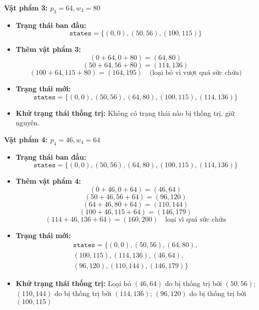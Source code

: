 \begin{example}
\textbf{Vật phẩm 3: \( p_3 = 64, w_3 = 80 \)}
\begin{itemize}
    \item \textbf{Trạng thái ban đầu:}
    \[
    \texttt{states} = \{(0, 0), (50, 56), (100, 115)\}
    \]
    \item \textbf{Thêm vật phẩm 3:}
    \[
    (0 + 64, 0 + 80) = (64, 80)
    \]
    \[
    (50 + 64, 56 + 80) = (114, 136)
    \]
    \[
    (100 + 64, 115 + 80) = (164, 195) \quad \text{(loại bỏ vì vượt quá sức chứa)}
    \]
    \item \textbf{Trạng thái mới:}
    \[
    \texttt{states} = \{(0, 0), (50, 56), (64, 80), (100, 115), (114, 136)\}
    \]
    \item \textbf{Khử trạng thái thống trị:} Không có trạng thái nào bị thống trị, giữ nguyên.
\end{itemize}

\textbf{Vật phẩm 4: \( p_4 = 46, w_4 = 64 \)}
\begin{itemize}
    \item \textbf{Trạng thái ban đầu:}
    \[
    \texttt{states} = \{(0, 0), (50, 56), (64, 80), (100, 115), (114, 136)\}
    \]
    \item \textbf{Thêm vật phẩm 4:}
    \[
    (0 + 46, 0 + 64) = (46, 64)
    \]
    \[
    (50 + 46, 56 + 64) = (96, 120)
    \]
    \[
    (64 + 46, 80 + 64) = (110, 144)
    \]
    \[
    (100 + 46, 115 + 64) = (146, 179)
    \]
     \[
    (114 + 46, 136 + 64) = (160, 200) \quad \text{loại vì quá sức chứa}
    \]
    \item \textbf{Trạng thái mới:}
    \begin{align*}
        \texttt{states} = \{(0, 0), (50, 56), (64, 80), \\ (100, 115), (114, 136),
        (46, 64), \\ (96, 120), (110, 144), (146, 179)
        \}
    \end{align*}
    \item \textbf{Khử trạng thái thống trị:} Loại bỏ \( (46, 64) \) do bị thống trị bởi \( (50, 56) \); $(110, 144)$ do bị thống trị bởi $(114, 136)$; $(96, 120)$ do bị thống trị bởi $(100, 115)$
\end{itemize}


\end{example}
